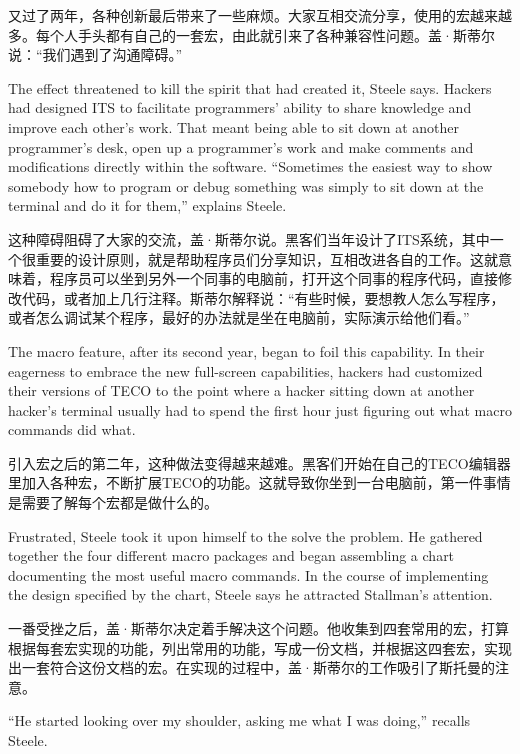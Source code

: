 \ifdefined\chs
又过了两年，各种创新最后带来了一些麻烦。大家互相交流分享，使用的宏越来越多。每个人手头都有自己的一套宏，由此就引来了各种兼容性问题。盖·斯蒂尔说：``我们遇到了沟通障碍。''
\fi

\ifdefined\eng
The effect threatened to kill the spirit that had created it, Steele says. Hackers had designed ITS to facilitate programmers' ability to share knowledge and improve each other's work. That meant being able to sit down at another programmer's desk, open up a programmer's work and make comments and modifications directly within the software. ``Sometimes the easiest way to show somebody how to program or debug something was simply to sit down at the terminal and do it for them,'' explains Steele.
\fi

\ifdefined\chs
这种障碍阻碍了大家的交流，盖·斯蒂尔说。黑客们当年设计了ITS系统，其中一个很重要的设计原则，就是帮助程序员们分享知识，互相改进各自的工作。这就意味着，程序员可以坐到另外一个同事的电脑前，打开这个同事的程序代码，直接修改代码，或者加上几行注释。斯蒂尔解释说：``有些时候，要想教人怎么写程序，或者怎么调试某个程序，最好的办法就是坐在电脑前，实际演示给他们看。''
\fi

\ifdefined\eng
The macro feature, after its second year, began to foil this capability. In their eagerness to embrace the new full-screen capabilities, hackers had customized their versions of TECO to the point where a hacker sitting down at another hacker's terminal usually had to spend the first hour just figuring out what macro commands did what.
\fi

\ifdefined\chs
引入宏之后的第二年，这种做法变得越来越难。黑客们开始在自己的TECO编辑器里加入各种宏，不断扩展TECO的功能。这就导致你坐到一台电脑前，第一件事情是需要了解每个宏都是做什么的。
\fi

\ifdefined\eng
Frustrated, Steele took it upon himself to \ifdefined\vone the \fi solve the problem. He gathered together the four different macro packages and began assembling a chart documenting the most useful macro commands. In the course of implementing the design specified by the chart, Steele says he attracted Stallman's attention.
\fi

\ifdefined\chs
一番受挫之后，盖·斯蒂尔决定着手解决这个问题。他收集到四套常用的宏，打算根据每套宏实现的功能，列出常用的功能，写成一份文档，并根据这四套宏，实现出一套符合这份文档的宏。在实现的过程中，盖·斯蒂尔的工作吸引了斯托曼的注意。
\fi

\ifdefined\eng
``He started looking over my shoulder, asking me what I was doing,'' recalls Steele.
\fi

